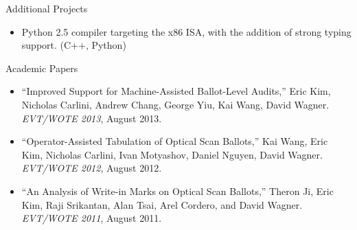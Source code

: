 \documentclass{resume}
\begin{document}
\begin{component}{Additional Projects}
\begin{itemize}
		\vspace{-0.5em}\item Python 2.5 compiler targeting the x86 ISA, with the addition of
		strong typing support. (C++, Python)
	\end{itemize}
\end{component}

\vspace{-0.75em}

\begin{component}{Academic Papers}
\vspace{-0.5em}
	\begin{itemize}
        \item[] ``Improved Support for Machine-Assisted Ballot-Level Audits,'' Eric Kim, Nicholas Carlini, Andrew Chang, George Yiu, Kai Wang, David Wagner. \emph{EVT/WOTE 2013}, August 2013.
\vspace{-0.5em}
        \item[] ``Operator-Assisted Tabulation of Optical Scan Ballots,'' Kai Wang, Eric Kim, Nicholas Carlini, Ivan Motyashov, Daniel Nguyen, David Wagner. \emph{EVT/WOTE 2012}, August 2012.
\vspace{-0.5em}
		\item[] ``An Analysis of Write-in Marks on Optical Scan Ballots,'' Theron Ji, Eric Kim, Raji Srikantan, Alan Tsai, Arel Cordero, and David Wagner. \emph{EVT/WOTE 2011}, August 2011.
\vspace{-0.5em}
	\end{itemize}
\end{component}

\end{document}
